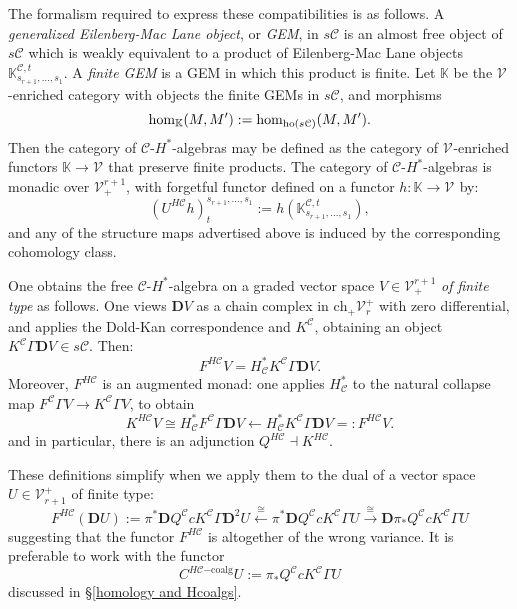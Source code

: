 \documentclass[11pt]{amsart} \renewcommand{\baselinestretch}{1.2}
\theoremstyle{plain}
\theoremstyle{definition}
\renewcommand{\to}{\longrightarrow}
\newcommand{\from}{\longleftarrow}
\newcommand{\calV}{\mathcal{V}}
\newcommand{\calc}{\mathcal{C}}
\newcommand{\vect}[2]{\calV^{#1}_{#2}}
\newcommand{\HA}[1]{H#1}
\newcommand{\HC}[1]{H#1\mathrm{-coalg}}
\newcommand{\complexes}{\mathrm{ch}_+}
\newcommand{\dual}{\mathbf{D}}
\begin{document}
\begin{Pi-algebras and cohomology algebras}
The formalism required to express these compatibilities is as follows. A \emph{generalized Eilenberg-Mac Lane object}, or \emph{GEM}, in $s\calc$ is an almost free object of $s\calc$ which is weakly equivalent to a product of Eilenberg-Mac Lane objects  $\mathbb{K}_{s_{r+1},\ldots,s_{1}}^{\calc,t}$. A \emph{finite GEM} is a GEM in which this product is finite. Let $\mathbb{K}$  be the $\vect{}{}$-enriched category with objects the finite GEMs in $s\calc$, and morphisms
\[\hom_{\mathbb{K}}(M,M'):=\hom_{\textup{ho}(s\calc)}(M,M').\]
Then the category of $\calc$-$H^*$-algebras  may be defined as the category of $\vect{}{}$-enriched functors $\mathbb{K}\to \vect{}{}$ that preserve finite products. The category of $\calc$-$H^*$-algebras is monadic over $\vect{r+1}{+}$, with forgetful functor defined  on a functor $h:\mathbb{K}\to \vect{}{}$  by:%
\[(U^{\HA{\calc}}h)_t^{s_{r+1},\ldots,s_1}:=h(\mathbb{K}_{s_{r+1},\ldots,s_{1}}^{\calc,t}),\]
and any of the structure maps advertised above is induced by the corresponding cohomology class. %

One obtains the free $\calc$-$H^*$-algebra on a graded vector space $V\in \vect{r+1}{+}$ \emph{of finite type} as follows. One views $\dual V$ as a chain complex in $\complexes\vect{+}{r}$ with zero differential, and applies the Dold-Kan correspondence and $K^\calc$, obtaining an object $K^\calc\Gamma \dual V\in s\calc$. Then:
\[F^{\HA{\calc}}V=H^*_{\calc}K^\calc\Gamma\dual V.\]
Moreover, $F^{\HA{\calc}}$ is an augmented monad: one applies $H^*_{\calc}$ to the natural collapse map $F^{\calc}\Gamma V\to K^{\calc}\Gamma V$, to obtain
\[K^{\HA{\calc}}V\cong H^*_{\calc} F^{\calc}\Gamma \dual V\from H^*_{\calc} K^{\calc}\Gamma \dual V=:F^{\HA{\calc}}V.\]
and in particular, there is an adjunction $Q^{\HA{\calc}}\dashv K^{\HA{\calc}}$.

These definitions simplify when we apply them to the dual of a vector space $U\in\vect{+}{r+1}$ of finite type:
\[F^{\HA{\calc}}(\dual U):= \pi^*\dual Q^{\calc}cK^\calc\Gamma \dual^{2}U\overset{\cong}{\from}\pi^*\dual Q^{\calc}cK^\calc\Gamma U\overset{\cong}{\to} \dual  \pi_*Q^{\calc}cK^\calc\Gamma U\]
suggesting that the functor $F^{\HA{\calc}}$ is altogether of the wrong variance. It is preferable to work with the functor
\[C^{\HC{\calc}}U:=\pi_*Q^{\calc}cK^\calc\Gamma U\]
discussed in \S\ref{homology and Hcoalgs}.




\end{Pi-algebras and cohomology algebras}
\end{document}
